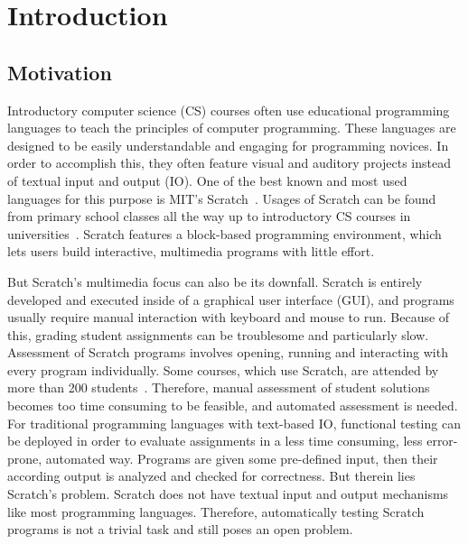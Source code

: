 
\chapter{Introduction}

\section{Motivation}

Introductory computer science (CS) courses often use educational programming languages to teach the principles of computer programming.
These languages are designed to be easily understandable and engaging for programming novices.
In order to accomplish this, they often feature visual and auditory projects instead of textual input and output (IO).
One of the best known and most used languages for this purpose is MIT's Scratch~\cite{scratch, scratchproject}.
Usages of Scratch can be found from primary school classes all the way up to introductory CS courses in universities~\cite{itch}.
Scratch features a block-based programming environment, which lets users build interactive, multimedia programs with little effort.
\parspace

But Scratch's multimedia focus can also be its downfall.
Scratch is entirely developed and executed inside of a graphical user interface (GUI), and programs usually require manual interaction with keyboard and mouse to run.
Because of this, grading student assignments can be troublesome and particularly slow.
Assessment of Scratch programs involves opening, running and interacting with every program individually.
Some courses, which use Scratch, are attended by more than 200 students~\cite{itch}.
Therefore, manual assessment of student solutions becomes too time consuming to be feasible, and automated assessment is needed.
For traditional programming languages with text-based IO, functional testing can be deployed in order to evaluate assignments in a less time consuming, less error-prone, automated way.
Programs are given some pre-defined input, then their according output is analyzed and checked for correctness.
But therein lies Scratch's problem.
Scratch does not have textual input and output mechanisms like most programming languages.
Therefore, automatically testing Scratch programs is not a trivial task and still poses an open problem.
\parspace

